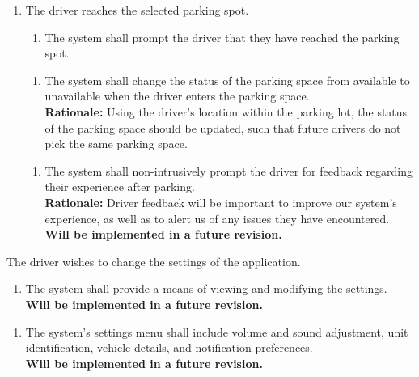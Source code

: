 \documentclass[12pt,letterpaper]{article}
\newcounter{businesseventnum}
\newcounter{funcreqnum}
\begin{document}
\begin{enumerate}[{BE}\thebusinesseventnum.] 
\item The driver reaches the selected parking spot.
\begin{enumerate}[{FR}\thefuncreqnum.] 
    \item The system shall prompt the driver that they have reached the parking
    spot. \label{poc4}
\end{enumerate}

\begin{enumerate}[{FR}\thefuncreqnum.] 
    \item The system shall change the status of the parking space from available
    to unavailable when the driver enters the parking space. \label{poc5}\\
    \textbf{Rationale:} Using the driver's location within the parking lot, the
    status of the parking space should be updated, such that future drivers do
    not pick the same parking space.
\end{enumerate}
\color{red} {
\begin{enumerate}[{FR}\thefuncreqnum.] 
    \item The system shall non-intrusively prompt the driver for feedback
    regarding their experience after parking.\\
    \textbf{Rationale:} Driver feedback will be important to improve our
    system's experience, as well as to alert us of any issues they have
    encountered.\\
    \textbf{Will be implemented in a future revision.}
\end{enumerate}
}
\end{enumerate}

\begin{enumerate}[{BE}\thebusinesseventnum.] 
\color{red} {
\item The driver wishes to change the settings of the application. } \color{red}
{
\begin{enumerate}[{FR}\thefuncreqnum.] 
    \item The system shall provide a means of viewing and modifying the
    settings.\\
    \textbf{Will be implemented in a future revision.}
\end{enumerate}
} \color{red} {
\begin{enumerate}[{FR}\thefuncreqnum.] 
    \item The system's settings menu shall include volume and sound adjustment,
    unit identification, vehicle details, and notification preferences.\\
    \textbf{Will be implemented in a future revision.}
\end{enumerate}
}
\end{enumerate}
\end{document}
